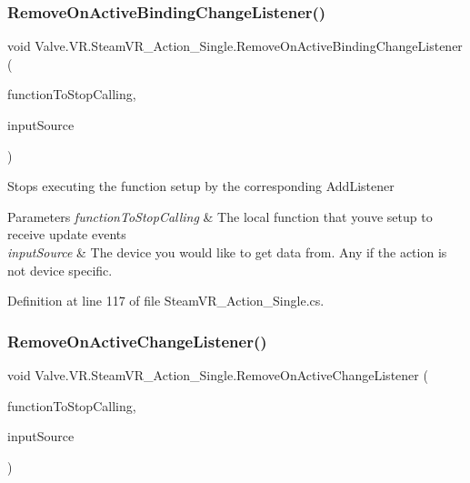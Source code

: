 \subsubsection{\texorpdfstring{RemoveOnActiveBindingChangeListener()}{RemoveOnActiveBindingChangeListener()}}
{\footnotesize\ttfamily void Valve.\+V\+R.\+Steam\+V\+R\+\_\+\+Action\+\_\+\+Single.\+Remove\+On\+Active\+Binding\+Change\+Listener (\begin{DoxyParamCaption}\item[{\mbox{\hyperlink{class_valve_1_1_v_r_1_1_steam_v_r___action___single_a45ad70dbb8a58191f373b7ae098b833b}{Active\+Change\+Handler}}}]{function\+To\+Stop\+Calling,  }\item[{\mbox{\hyperlink{namespace_valve_1_1_v_r_a82e5bf501cc3aa155444ee3f0662853f}{Steam\+V\+R\+\_\+\+Input\+\_\+\+Sources}}}]{input\+Source }\end{DoxyParamCaption})}



Stops executing the function setup by the corresponding Add\+Listener 


\begin{DoxyParams}{Parameters}
{\em function\+To\+Stop\+Calling} & The local function that you\textquotesingle{}ve setup to receive update events\\
\hline
{\em input\+Source} & The device you would like to get data from. Any if the action is not device specific.\\
\hline
\end{DoxyParams}


Definition at line 117 of file Steam\+V\+R\+\_\+\+Action\+\_\+\+Single.\+cs.

\mbox{\label{class_valve_1_1_v_r_1_1_steam_v_r___action___single_ae56434d507e319e8a216e724728dbe76}} 
\subsubsection{\texorpdfstring{RemoveOnActiveChangeListener()}{RemoveOnActiveChangeListener()}}
{\footnotesize\ttfamily void Valve.\+V\+R.\+Steam\+V\+R\+\_\+\+Action\+\_\+\+Single.\+Remove\+On\+Active\+Change\+Listener (\begin{DoxyParamCaption}\item[{\mbox{\hyperlink{class_valve_1_1_v_r_1_1_steam_v_r___action___single_a45ad70dbb8a58191f373b7ae098b833b}{Active\+Change\+Handler}}}]{function\+To\+Stop\+Calling,  }\item[{\mbox{\hyperlink{namespace_valve_1_1_v_r_a82e5bf501cc3aa155444ee3f0662853f}{Steam\+V\+R\+\_\+\+Input\+\_\+\+Sources}}}]{input\+Source }\end{DoxyParamCaption})}



